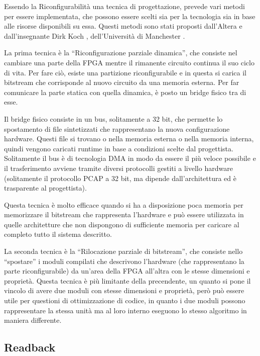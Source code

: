 \documentclass[a4paper,titlepage]{book}
\begin{document}
Essendo la Riconfigurabilità una tecnica di progettazione, prevede vari metodi per essere implementata, che possono essere scelti sia per la tecnologia sia in base alle risorse disponibili su essa. Questi metodi sono stati proposti dall'Altera \cite{PR1} e dall'insegnante Dirk Koch , dell'Università di Manchester \cite{PR2}.

La prima tecnica è la ``Riconfigurazione parziale dinamica'', che consiste nel cambiare una parte della FPGA mentre il rimanente circuito continua il suo ciclo di vita. Per fare ciò, esiste una partizione riconfigurabile e in questa si carica il bitstream che corrisponde al nuovo circuito da una memoria esterna. Per far comunicare la parte statica con quella dinamica, è posto un bridge fisico tra di esse.

Il bridge fisico consiste in un bus, solitamente a 32 bit, che permette lo spostamento di file sintetizzati che rappresentano la nuova configurazione hardware. Questi file si trovano o nella memoria esterna o nella memoria interna, quindi vengono caricati runtime in base a condizioni scelte dal progettista. Solitamente il bus è di tecnologia DMA in modo da essere il più veloce possibile e il trasferimento avviene tramite diversi protocolli gestiti a livello hardware (solitamente il protocollo PCAP a 32 bit, ma dipende dall'architettura ed è trasparente al progettista).

Questa tecnica è molto efficace quando si ha a disposizione poca memoria per memorizzare il bitstream che rappresenta l'hardware e può essere utilizzata in quelle architetture che non dispongono di sufficiente memoria per caricare al completo tutto il sistema descritto.


La seconda tecnica è la ``Rilocazione parziale di bitstream'', che consiste nello ``spostare'' i moduli compilati che descrivono l'hardware (che rappresentano la parte riconfigurabile) da un'area della FPGA all'altra con le stesse dimensioni e proprietà. Questa tecnica è più limitante della precendente, un quanto si pone il vincolo di avere due moduli con stesse dimensioni e proprietà, però può essere utile per questioni di ottimizzazione di codice, in quanto i due moduli possono rappresentare la stessa unità ma al loro interno eseguono lo stesso algoritmo in maniera differente.

\subsection{Readback}
\end{document}
